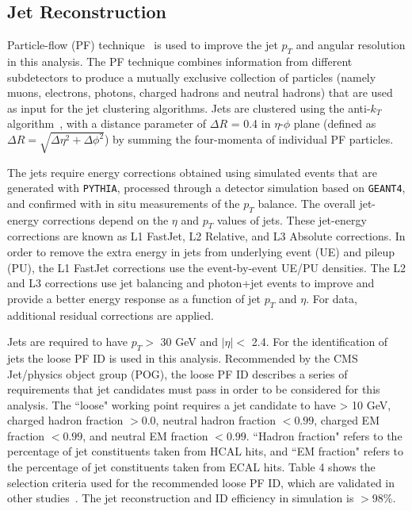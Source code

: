 \subsection{Jet Reconstruction}

Particle-flow (PF) technique~\cite{CMS-PAS-PFT-09-001,CMS-PAS-PFT-10-002} is used to improve the jet $p_T$ and angular resolution in this analysis.
The PF technique combines information from different subdetectors to produce a mutually exclusive collection of particles (namely muons, electrons, photons, 
charged hadrons and neutral hadrons) that are used as input for the jet clustering algorithms.
Jets are clustered using the anti-$k_{T}$ algorithm~\cite{anti-kT}, with a distance parameter of $\Delta R$ = 0.4 in $\eta$-$\phi$ plane (defined as $\Delta R = 
\sqrt{\Delta \eta^2 + \Delta \phi^2}$) by summing the four-momenta of individual PF particles.

The jets require energy corrections obtained using simulated events that are generated with \texttt{PYTHIA}, processed through a detector simulation based on 
\texttt{GEANT4}, and confirmed with in situ measurements of the $p_T$ balance.
The overall jet-energy corrections depend on the $\eta$ and $p_T$ values of jets.
These jet-energy corrections are known as L1 FastJet, L2 Relative, and L3 Absolute corrections. In order to remove the extra energy in jets from underlying event 
(UE) and pileup (PU), the L1 FastJet corrections use the event-by-event UE/PU densities.
The L2 and L3 corrections use jet balancing and photon+jet events to improve and provide a better energy response as a function of jet $p_T$ and $\eta$.
For data, additional residual corrections are applied.

Jets are required to have $p_T >$ 30 GeV and $|\eta| <$ 2.4.
For the identification of jets the loose PF ID is used in this analysis. Recommended by the CMS Jet/\MET physics object group (POG), the loose PF ID describes a series of requirements that jet candidates must pass in order to be considered for this analysis. The ``loose" working point requires a jet candidate to have \pt > 10 GeV, charged hadron fraction $> 0.0$, neutral hadron fraction $< 0.99$, charged EM fraction $< 0.99$, and neutral EM fraction $< 0.99$. ``Hadron fraction" refers to the percentage of jet constituents taken from HCAL hits, and ``EM fraction" refers to the percentage of jet constituents taken from ECAL hits.
Table 4 shows the selection criteria used for the recommended loose PF ID, which are validated in other studies~\cite{CMS-PAS-FSQ-12-035}.
The jet reconstruction and ID efficiency in simulation is $>$98\%.

